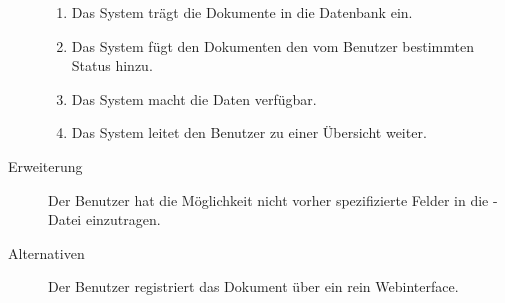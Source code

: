 \begin{description}
\begin{enumerate}
      \item Das System trägt die Dokumente in die Datenbank ein.
      \item Das System fügt den Dokumenten den vom Benutzer bestimmten Status hinzu.
      \item Das System macht die Daten verfügbar.
      \item Das System leitet den Benutzer zu einer Übersicht weiter.
    \end{enumerate}
  \item[Erweiterung]Der Benutzer hat die Möglichkeit nicht vorher spezifizierte Felder in die \BibTeX -Datei einzutragen.
  \item[Alternativen]Der Benutzer registriert das Dokument über ein rein Webinterface.
\end{description}

